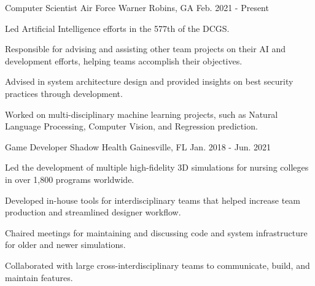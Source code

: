 \documentclass[11pt, a4paper]{awesome-cv}
\begin{document}
\begin{cventries}

  \cventry
    {Computer Scientist} %
    {Air Force} %
    {Warner Robins, GA} %
    {Feb. 2021 - Present} %
    {
      \begin{cvitems} %
        \item {Led Artificial Intelligence efforts in the 577th of the DCGS.}
        \item {Responsible for advising and assisting other team projects on their AI and development efforts, helping teams accomplish their objectives.}
        \item {Advised in system architecture design and provided insights on best security practices through development.}
        \item {Worked on multi-disciplinary machine learning projects, such as Natural Language Processing, Computer Vision, and Regression prediction.}
      \end{cvitems}
    }

  \cventry
    {Game Developer} %
    {Shadow Health} %
    {Gainesville, FL} %
    {Jan. 2018 - Jun. 2021} %
    {
      \begin{cvitems} %
        \item {Led the development of multiple high-fidelity 3D simulations for nursing colleges in over 1,800 programs worldwide.}
        \item {Developed in-house tools for interdisciplinary teams that helped increase team production and streamlined designer workflow.}
        \item {Chaired meetings for maintaining and discussing code and system infrastructure for older and newer simulations.}
        \item {Collaborated with large cross-interdisciplinary teams to communicate, build, and maintain features.}
      \end{cvitems}
    }

\end{cventries}
\end{document}
